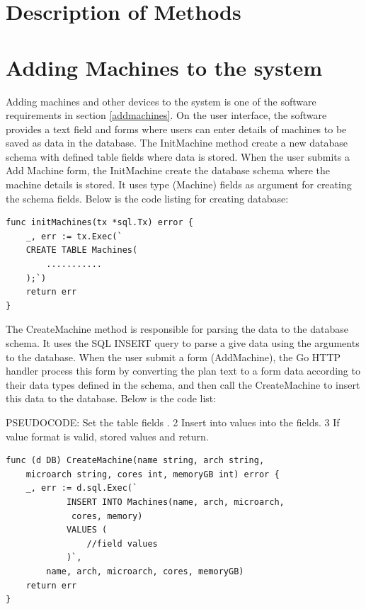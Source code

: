 \section{Description of Methods}
\section*{Adding Machines to the system}
Adding machines and other devices to the system is one of the software requirements in section \ref{addmachines}. On the user interface, the software provides a text field and forms where users can enter details of machines to be saved as data in the database. The InitMachine method create a new database schema with defined table fields where data is stored. When the user submits a Add Machine form, the InitMachine create the database schema where the machine details is stored. It uses type (Machine) fields as argument for creating the schema fields. Below is the code listing for creating database:
\lstset{basicstyle=\footnotesize\ttfamily,breaklines=true}
\lstset{framextopmargin=50pt,frame=bottomline}
\begin{lstlisting}[caption=Creating Database for machine, label=Initializing database]
func initMachines(tx *sql.Tx) error {
	_, err := tx.Exec(`
	CREATE TABLE Machines(
		...........
	);`)
	return err
}
\end{lstlisting}

The CreateMachine method is responsible for parsing the data to the database schema. It uses the SQL INSERT query to parse a give data using the arguments to the database. When the user submit a form (AddMachine), the Go HTTP handler process this form by converting the plan text to a form data according to their data types defined in the schema, and then call the CreateMachine to insert this data to the database. Below is the code list:

PSEUDOCODE: Set the table fields .
2 Insert into values into the fields.
3 If value format is valid, stored values and return.

\begin{lstlisting}[caption=Adding machines details, label=Adding machine]
func (d DB) CreateMachine(name string, arch string,
	microarch string, cores int, memoryGB int) error {
	_, err := d.sql.Exec(`
			INSERT INTO Machines(name, arch, microarch,
			 cores, memory)
			VALUES (
				//field values
			)`,
		name, arch, microarch, cores, memoryGB)
	return err
}
\end{lstlisting}

